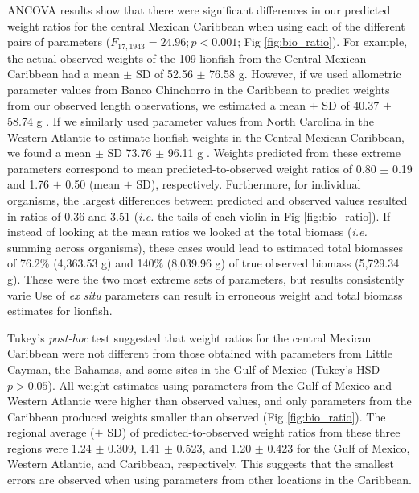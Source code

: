 \documentclass[fleqn,10pt,lineno]{wlpeerj} %
\begin{document}
ANCOVA results show that there were significant differences in our
predicted weight ratios for the central Mexican Caribbean when using
each of the different pairs of parameters
(\(F_{17, 1943} = 24.96; p < 0.001\); Fig \ref{fig:bio_ratio}). For
example, the actual observed weights of the 109 lionfish from the
Central Mexican Caribbean had a mean \(\pm\) SD of 52.56 \(\pm\) 76.58
g. However, if we used allometric parameter values from Banco Chinchorro
in the Caribbean to predict weights from our observed length
observations, we estimated a mean \(\pm\) SD of 40.37 \(\pm\) 58.74 g
\citep{sabidoitz_2016}. If we similarly used parameter values from North
Carolina in the Western Atlantic to estimate lionfish weights in the
Central Mexican Caribbean, we found a mean \(\pm\) SD 73.76 \(\pm\)
96.11 g \citep{barbour_2011}. Weights predicted from these extreme
parameters correspond to mean predicted-to-observed weight ratios of
0.80 \(\pm\) 0.19 and 1.76 \(\pm\) 0.50 (mean \(\pm\) SD), respectively.
Furthermore, for individual organisms, the largest differences between
predicted and observed values resulted in ratios of 0.36 and 3.51
(\emph{i.e.} the tails of each violin in Fig \ref{fig:bio_ratio}). If
instead of looking at the mean ratios we looked at the total biomass
(\emph{i.e.} summing across organisms), these cases would lead to
estimated total biomasses of 76.2\% (4,363.53 g) and 140\% (8,039.96 g)
of true observed biomass (5,729.34 g). These were the two most extreme
sets of parameters, but results consistently varie Use of \emph{ex situ}
parameters can result in erroneous weight and total biomass estimates
for lionfish.

Tukey's \emph{post-hoc} test suggested that weight ratios for the
central Mexican Caribbean were not different from those obtained with
parameters from Little Cayman, the Bahamas, and some sites in the Gulf
of Mexico (Tukey's HSD \(p > 0.05\)). All weight estimates using
parameters from the Gulf of Mexico and Western Atlantic were higher than
observed values, and only parameters from the Caribbean produced weights
smaller than observed (Fig \ref{fig:bio_ratio}). The regional average
(\(\pm\) SD) of predicted-to-observed weight ratios from these three
regions were 1.24 \(\pm\) 0.309, 1.41 \(\pm\) 0.523, and 1.20 \(\pm\)
0.423 for the Gulf of Mexico, Western Atlantic, and Caribbean,
respectively. This suggests that the smallest errors are observed when
using parameters from other locations in the Caribbean.
\end{document}
